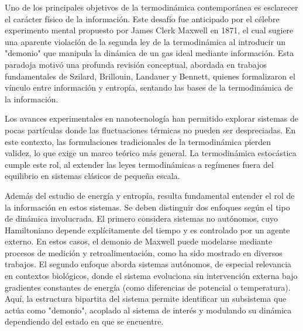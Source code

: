 %
%


Uno de los principales objetivos de la termodinámica contemporánea es esclarecer el carácter físico de la información. Este desafío fue anticipado por el célebre experimento mental propuesto por James Clerk Maxwell en 1871, el cual sugiere una aparente violación de la segunda ley de la termodinámica al introducir un "demonio" que manipula la dinámica de un gas ideal mediante información\cite{Maxwell_1871}. Esta paradoja motivó una profunda revisión conceptual, abordada en trabajos fundamentales de Szilard\cite{szilard1964decrease}, Brillouin\cite{brillouin1951maxwell}, Landauer\cite{Landauer_1961} y Bennett\cite{bennett1982thermodynamics}, quienes formalizaron el vínculo entre información y entropía, sentando las bases de la termodinámica de la información.

Los avances experimentales en nanotecnología han permitido explorar sistemas de pocas partículas donde las fluctuaciones térmicas no pueden ser despreciadas\cite{douarche2005experimental,wang2005experimental}. En este contexto, las formulaciones tradicionales de la termodinámica pierden validez, lo que exige un marco teórico más general. La termodinámica estocástica cumple este rol, al extender las leyes termodinámicas a regímenes fuera del equilibrio en sistemas clásicos de pequeña escala\cite{van2013stochastic,jarzynski1997nonequilibrium}.

Además del estudio de energía y entropía, resulta fundamental entender el rol de la información en estos sistemas. Se deben distinguir dos enfoques según el tipo de dinámica involucrada. El primero considera sistemas no autónomos, cuyo Hamiltoniano depende explícitamente del tiempo y es controlado por un agente externo. En estos casos, el demonio de Maxwell puede modelarse mediante procesos de medición y retroalimentación, como ha sido mostrado en diversos trabajos\cite{cao2009thermodynamics,sagawa2010generalized}. El segundo enfoque aborda sistemas autónomos, de especial relevancia en contextos biológicos\cite{ehrich2023energy}, donde el sistema evoluciona sin intervención externa bajo gradientes constantes de energía (como diferencias de potencial o temperatura). Aquí, la estructura bipartita del sistema permite identificar un subsistema que actúa como "demonio", acoplado al sistema de interés y modulando su dinámica dependiendo del estado en que se encuentre.

